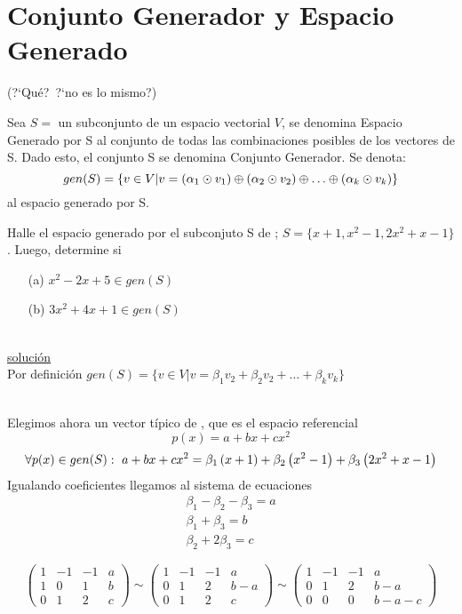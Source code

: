 \section{Conjunto Generador y Espacio Generado}(?`Qué?\ ?`no es lo mismo?)


\begin{dfn}
Sea $S=$ un subconjunto de un espacio vectorial $V$, se denomina Espacio Generado por S al conjunto de todas las combinaciones posibles de los vectores de S. Dado esto, el conjunto S se denomina Conjunto Generador. Se denota:
\[gen(S)=
\lbrace v \in V|v= \left(\alpha_1 \odot v_1\right)  \oplus
 \left(\alpha_2 \odot v_2\right)  \oplus 
\hdots \oplus
 \left(\alpha_k \odot v_k\right) 
\rbrace
\]
al espacio generado por S.
\end{dfn}

\begin{ejemplo}
Halle el espacio generado por el subconjuto S de \pdos; $S=\lbrace
x+1, x^2-1, 2x^2+x-1\rbrace$. Luego, determine si 
\begin{enumerate}
\item[(a)]$x^2-2x+5 \in gen(S)$
\item[(b)]$3x^2+4x+1 \in gen(S)$
\end{enumerate}
\end{ejemplo}

~\\
\underline{solución}
~\\
Por definición $gen(S)=
\lbrace v \in V|v=
\beta_1 v_2+
\beta_2 v_2+
\ldots+
\beta_k v_k
\rbrace
$

~\\
Elegimos ahora un vector típico de \pdos, que es el espacio referencial
\[p(x)=a+b x+c x^2\]
$$\forall p(x)\in gen(S):\  
a+b x+c x^2=
 \beta_1\left(x+1\right) +
 \beta_2\left(x^2-1\right) +
 \beta_3\left(2x^2+x-1\right) 
$$
Igualando coeficientes llegamos al sistema de ecuaciones
\begin{eqnarray*}
\beta_1-\beta_2-\beta_3=a\\
\beta_1+\beta_3=b\\
\beta_2+2\beta_3=c
\end{eqnarray*}

\[
\left(
\begin{array}{rrr|c}
1&-1&-1&a\\
1&0&1&b\\
0&1&2&c
\end{array}
\right)
\sim
\left(
\begin{array}{rrr|c}
1&-1&-1&a\\
0&1&2&b-a\\
0&1&2&c
\end{array}
\right)
\sim
\left(
\begin{array}{rrr|c}
1&-1&-1&a\\
0&1&2&b-a\\
0&0&0&b-a-c
\end{array}
\right)
\]

